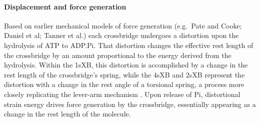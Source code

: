 \documentclass[]{article}
\begin{document}
\paragraph{Displacement and force generation} %
Based on earlier mechanical models of force generation (e.g.\ Pate and Cooke; Daniel et al; Tanner et al.) each crossbridge undergoes a distortion upon the hydrolysis of ATP to ADP.Pi.  
That distortion changes the effective rest length of the crossbridge by an amount proportional to the energy derived from the hydrolysis.  
Within the 1sXB, this distortion is accomplished by a change in the rest length of the crossbridge's spring, while the 4sXB and 2sXB represent the distortion with a change in the rest angle of a torsional spring, a process more closely replicating the lever-arm mechanism \citep{Reedy2000}.
Upon release of Pi, distortional strain energy drives force generation by the crossbridge, essentially appearing as a change in the rest length of the molecule.
\end{document}
